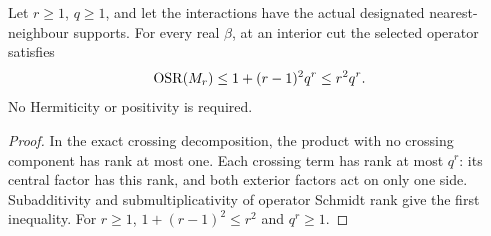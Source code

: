 \begin{lemma}
    \label{thm:physical_cluster_all_cut_rank}
    \leanok
    Let $r\geq1$, $q\geq1$, and let the interactions have the actual
    designated nearest-neighbour supports. For every real $\beta$,
    at an interior cut the selected operator satisfies
    \begin{align}
        \operatorname{OSR}(M_r)
        \leq1+(r-1)^2q^r\leq r^2q^r.\notag
    \end{align}
    No Hermiticity or positivity is required.
\end{lemma}
\begin{proof}\leanok
    In the exact crossing decomposition, the product with no
    crossing component has rank at most one. Each crossing term
    has rank at most $q^r$: its central factor has this rank, and
    both exterior factors act on only one side. Subadditivity and
    submultiplicativity of operator Schmidt rank give the first
    inequality. For $r\geq1$, $1+(r-1)^2\leq r^2$ and $q^r\geq1$.
\end{proof}
